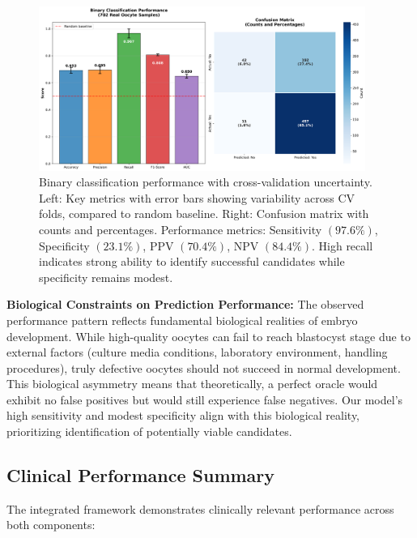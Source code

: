 \begin{figure}[H]
    \centering
    \includegraphics[width=0.95\textwidth]{figures/oocyte_classification_metrics.png}
    \caption{Binary classification performance with cross-validation uncertainty. Left: Key metrics with error bars showing variability across CV folds, compared to random baseline. Right: Confusion matrix with counts and percentages. Performance metrics: Sensitivity $(97.6\%)$, Specificity $(23.1\%)$, PPV $(70.4\%)$, NPV $(84.4\%)$. High recall indicates strong ability to identify successful candidates while specificity remains modest.}
    \label{fig:oocyte_metrics}
\end{figure}

\textbf{Biological Constraints on Prediction Performance:} The observed performance pattern reflects fundamental biological realities of embryo development. While high-quality oocytes can fail to reach blastocyst stage due to external factors (culture media conditions, laboratory environment, handling procedures), truly defective oocytes should not succeed in normal development. This biological asymmetry means that theoretically, a perfect oracle would exhibit no false positives but would still experience false negatives. Our model's high sensitivity and modest specificity align with this biological reality, prioritizing identification of potentially viable candidates.

\subsection{Clinical Performance Summary}

The integrated framework demonstrates clinically relevant performance across both components:

